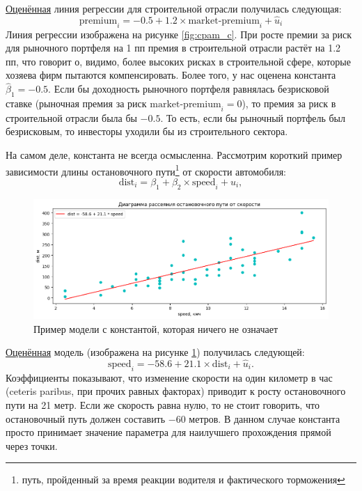 \documentclass[12pt]{article}
\newcommand{\hb}{\hat{\beta}}
\newcommand{\hu}{\hat{u}}
\begin{document}
\href{https://colab.research.google.com/drive/1ZQ7QuVCJS4I_GsXUrr7z7O-3wqXkXSMN?usp=sharing}{Оценённая} линия регрессии для строительной отрасли получилась следующая: 
\[
\text{premium}_i = -0.5 + 1.2 \times \text{market-premium}_i + \hu_i
\] 
Линия регрессии изображена на рисунке \ref{fig:cpam_c}. 
При росте премии за риск для рыночного портфеля на 1 пп премия в строительной отрасли растёт на 1.2 пп, что говорит о, видимо, более высоких рисках в строительной сфере, которые хозяева фирм пытаются компенсировать. Более того, у нас оценена константа $\hb_1 = -0.5$. 
Если бы доходность рыночного портфеля равнялась безрисковой ставке (рыночная премия за риск $\text{market-premium}_i = 0$), то премия за риск в строительной отрасли была бы $-0.5$. То есть, если бы рыночный портфель был безрисковым, то инвесторы уходили бы из строительного сектора.

На самом деле, константа не всегда осмысленна. 
Рассмотрим короткий пример зависимости длины остановочного пути\footnote{путь, пройденный за время реакции водителя и фактического торможения} от скорости автомобиля: 
\[
\text{dist}_i = \beta_1 + \beta_2 \times \text{speed}_i + u_i,
\]

\begin{figure}
    \centering
    \includegraphics[width=0.8\linewidth]{cars_ds.png}
    \caption{Пример модели с константой, которая ничего не означает}
    \label{fig:cars}
\end{figure}

\href{https://colab.research.google.com/drive/1ZQ7QuVCJS4I_GsXUrr7z7O-3wqXkXSMN?usp=sharing}{Оценённая} модель (изображена на рисунке \ref{fig:cars}) получилась следующей: 
\[
\text{speed}_i = -58.6 + 21.1 \times \text{dist}_i + \hu_i.
\]
Коэффициенты показывают, что изменение скорости на один километр в час (ceteris paribus, при прочих равных факторах) приводит к росту остановочного пути на 21 метр. 
Если же скорость равна нулю, то не стоит говорить, что остановочный путь должен составить $-60$ метров.
В данном случае константа просто принимает значение параметра для наилучшего прохождения прямой через точки.
\end{document}
